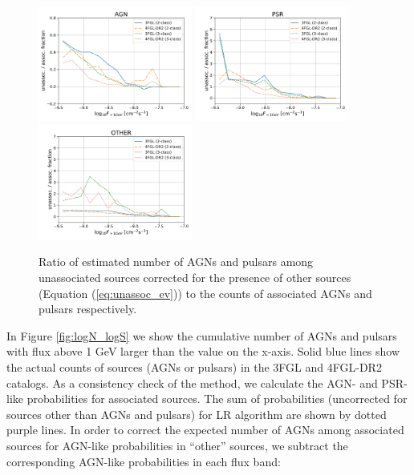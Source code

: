 \begin{figure}[h]
\center
\includegraphics[width=0.45\textwidth]{plots/N_logS_diff_AGN.pdf}
\includegraphics[width=0.45\textwidth]{plots/N_logS_diff_PSR.pdf}
\includegraphics[width=0.45\textwidth]{plots/N_logS_diff_OTHER.pdf}
\caption{Ratio of estimated number of AGNs and pulsars among unassociated sources corrected for the presence of other sources (Equation (\ref{eq:unassoc_ev})) to the counts of associated AGNs and pulsars respectively.}  
\label{fig:unass_vs_ass_frac}
\end{figure}




In Figure \ref{fig:logN_logS} we show the cumulative number of AGNs and pulsars with flux above 1 GeV larger than the
value on the x-axis.
Solid blue lines show the actual counts of sources (AGNs or pulsars) in the 3FGL and 4FGL-DR2 catalogs.
As a consistency check of the method, we calculate the AGN- and PSR-like probabilities for associated sources.
The sum of probabilities (uncorrected for sources other than AGNs and pulsars) for LR algorithm are shown by dotted purple lines.
In order to correct the expected number of AGNs among associated sources for AGN-like probabilities in ``other'' sources, 
we subtract the corresponding AGN-like probabilities in each flux band:

